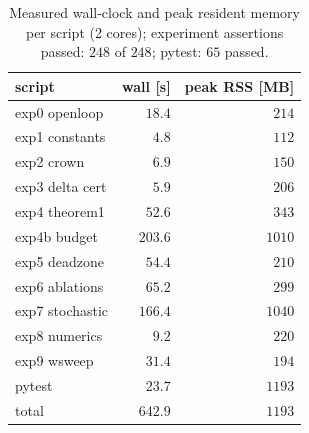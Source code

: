 \begin{table}[t]
\centering
\caption{Measured wall-clock and peak resident memory per script (2 cores); experiment assertions passed: $248$ of $248$; pytest: $65$ passed.}
\label{tab:runtimes}
\footnotesize
\begin{tabular}{lrr}
\toprule
script & wall [s] & peak RSS [MB] \\
\midrule
exp0 openloop & $18.4$ & $214$ \\
exp1 constants & $4.8$ & $112$ \\
exp2 crown & $6.9$ & $150$ \\
exp3 delta cert & $5.9$ & $206$ \\
exp4 theorem1 & $52.6$ & $343$ \\
exp4b budget & $203.6$ & $1010$ \\
exp5 deadzone & $54.4$ & $210$ \\
exp6 ablations & $65.2$ & $299$ \\
exp7 stochastic & $166.4$ & $1040$ \\
exp8 numerics & $9.2$ & $220$ \\
exp9 wsweep & $31.4$ & $194$ \\
pytest & $23.7$ & $1193$ \\
\midrule
total & $642.9$ & $1193$ \\
\bottomrule
\end{tabular}
\end{table}
